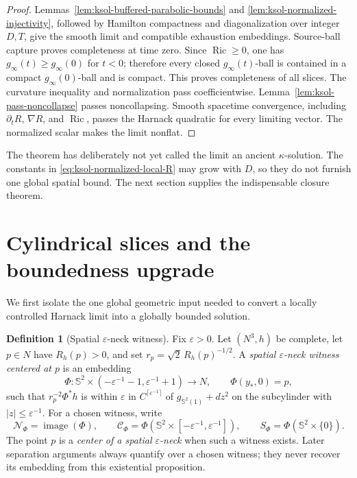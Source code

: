 \documentclass[10pt]{coll-l}
\newcommand{\Sph}{\mathbb{S}}
\theoremstyle{definition}
\newtheorem{definition}[theorem]{Definition}
\theoremstyle{remark}
\numberwithin{section}{chapter}
\numberwithin{equation}{chapter}
\newcommand{\Ric}{\operatorname{Ric}}
\begin{document}
\begin{proof}
Lemmas~\ref{lem:ksol-buffered-parabolic-bounds} and
\ref{lem:ksol-normalized-injectivity}, followed by Hamilton compactness and
diagonalization over integer $D,T$, give the smooth limit and compatible
exhaustion embeddings.  Source-ball capture proves completeness at time
zero.  Since $\Ric\geq0$, one has $g_\infty(t)\geq g_\infty(0)$ for $t<0$;
therefore every closed $g_\infty(t)$-ball is contained in a compact
$g_\infty(0)$-ball and is compact.  This proves completeness of all slices.
The curvature inequality and normalization pass coefficientwise.
Lemma~\ref{lem:ksol-pass-noncollapse} passes noncollapsing.  Smooth
spacetime convergence, including $\partial_tR$, $\nabla R$, and $\Ric$,
passes the Harnack quadratic for every limiting vector.  The normalized
scalar makes the limit nonflat.
\end{proof}

The theorem has deliberately not yet called the limit an ancient
$\kappa$-solution.  The constants in
\eqref{eq:ksol-normalized-local-R} may grow with $D$, so they do not furnish
one global spatial bound.  The next section supplies the indispensable
closure theorem.

\section{Cylindrical slices and the boundedness upgrade}
\label{sec:ksol-Harnack-closure}

We first isolate the one global geometric input needed to convert a
locally controlled Harnack limit into a globally bounded solution.

\begin{definition}[Spatial $\varepsilon$-neck witness]
\label{def:ksol-spatial-neck}
Fix $\varepsilon>0$.  Let $(N^3,h)$ be complete, let $p\in N$ have
$R_h(p)>0$, and set
$r_p=\sqrt2\,R_h(p)^{-1/2}$.  A \emph{spatial $\varepsilon$-neck witness
centered at $p$} is an embedding
\begin{equation}
 \Phi:\Sph^2\times(-\varepsilon^{-1}-1,\varepsilon^{-1}+1)\longrightarrow N,
 \qquad \Phi(y_*,0)=p,                                 \label{eq:ksol-spatial-neck-embedding}
\end{equation}
such that $r_p^{-2}\Phi^*h$ is within $\varepsilon$ in
$C^{\lceil\varepsilon^{-1}\rceil}$ of
$g_{\Sph^2(1)}+dz^2$ on the subcylinder with
$|z|\leq\varepsilon^{-1}$.  For a chosen witness, write
\begin{equation}
 \mathcal N_\Phi=\operatorname{image}(\Phi),\qquad
 \mathcal C_\Phi=\Phi(\Sph^2\times[-\varepsilon^{-1},\varepsilon^{-1}]),
 \qquad S_\Phi=\Phi(\Sph^2\times\{0\}).               \label{eq:ksol-spatial-neck-witness-data}
\end{equation}
The point $p$ is a \emph{center of a spatial $\varepsilon$-neck} when such
a witness exists.  Later separation arguments always quantify over a
chosen witness; they never recover its embedding from this existential
proposition.
\end{definition}
\end{document}
